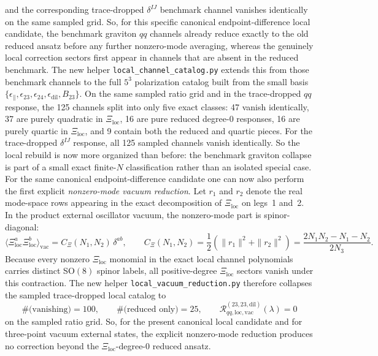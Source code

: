 \documentclass[11pt]{article}
\numberwithin{equation}{section}
\begin{document}
and the corresponding trace-dropped $\delta^{IJ}$ benchmark channel vanishes identically on the same sampled grid. So, for this specific canonical endpoint-difference local candidate, the benchmark graviton $qq$ channels already reduce exactly to the old reduced ansatz before any further nonzero-mode averaging, whereas the genuinely local correction sectors first appear in channels that are absent in the reduced benchmark. The new helper \texttt{local\_channel\_catalog.py} extends this from those benchmark channels to the full $5^3$ polarization catalog built from the small basis $\{\epsilon_\parallel,\epsilon_{23},\epsilon_{24},\epsilon_{\mathrm{dil}},B_{23}\}$. On the same sampled ratio grid and in the trace-dropped $qq$ response, the 125 channels split into only five exact classes: 47 vanish identically, 37 are purely quadratic in $\Xi_{\mathrm{loc}}$, 16 are pure reduced degree-$0$ responses, 16 are purely quartic in $\Xi_{\mathrm{loc}}$, and 9 contain both the reduced and quartic pieces. For the trace-dropped $\delta^{IJ}$ response, all 125 sampled channels vanish identically. So the local rebuild is now more organized than before: the benchmark graviton collapse is part of a small exact finite-$N$ classification rather than an isolated special case.
For the same canonical endpoint-difference candidate one can now also perform the first explicit \emph{nonzero-mode vacuum reduction}. Let $r_1$ and $r_2$ denote the real mode-space rows appearing in the exact decomposition of $\Xi_{\mathrm{loc}}$ on legs~1 and~2. In the product external oscillator vacuum, the nonzero-mode part is spinor-diagonal:
\begin{equation}
\label{eq:s14-023j}
\bigl\langle \Xi_{\mathrm{loc}}^a \Xi_{\mathrm{loc}}^b \bigr\rangle_{\mathrm{vac}}
=
C_\Xi(N_1,N_2)\,\delta^{ab},
\qquad
C_\Xi(N_1,N_2)
=
\frac12\!\left(\|r_1\|^2+\|r_2\|^2\right)
=
\frac{2N_1N_2-N_1-N_2}{2N_3}.
\end{equation}
Because every nonzero $\Xi_{\mathrm{loc}}$ monomial in the exact local channel polynomials carries distinct SO$(8)$ spinor labels, all positive-degree $\Xi_{\mathrm{loc}}$ sectors vanish under this contraction. The new helper \texttt{local\_vacuum\_reduction.py} therefore collapses the sampled trace-dropped local catalog to
\begin{equation}
\label{eq:s14-023k}
\#\bigl(\text{vanishing}\bigr)=100,
\qquad
\#\bigl(\text{reduced only}\bigr)=25,
\qquad
\mathcal{R}^{(23,23,\mathrm{dil})}_{qq,\mathrm{loc,vac}}(\lambda)=0
\end{equation}
on the sampled ratio grid. So, for the present canonical local candidate and for three-point vacuum external states, the explicit nonzero-mode reduction produces no correction beyond the $\Xi_{\mathrm{loc}}$-degree-$0$ reduced ansatz.
\end{document}
